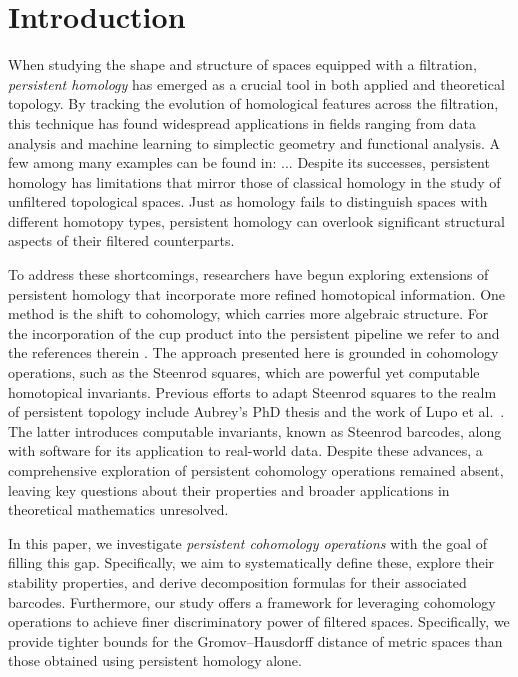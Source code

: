 
\section{Introduction} \label{s:introduction}

When studying the shape and structure of spaces equipped with a filtration, \textit{persistent homology} has emerged as a crucial tool in both applied and theoretical topology.
By tracking the evolution of homological features across the filtration, this technique has found widespread applications in fields ranging from data analysis and machine learning to simplectic geometry and functional analysis.
A few among many examples can be found in: ... 
Despite its successes, persistent homology has limitations that mirror those of classical homology in the study of unfiltered topological spaces.
Just as homology fails to distinguish spaces with different homotopy types, persistent homology can overlook significant structural aspects of their filtered counterparts.

To address these shortcomings, researchers have begun exploring extensions of persistent homology that incorporate more refined homotopical information. One method is the shift to cohomology, which carries more algebraic structure.
For the incorporation of the cup product into the persistent pipeline we refer to \cite{contessoto_et_al:LIPIcs.SoCG.2022.31, memoli2024persistent} and the references therein \cite{huang2005cup,yarmola2010persistence,herscovich2018higher,belchi2021a,contreras2022persistent}.
The approach presented here is grounded in cohomology operations, such as the Steenrod squares, which are powerful yet computable homotopical invariants.
Previous efforts to adapt Steenrod squares to the realm of persistent topology include Aubrey's PhD thesis \cite{aubrey2011thesis} and the work of Lupo et al.\ \cite{medina2022per_st}.
The latter introduces computable invariants, known as Steenrod barcodes, along with software for its application to real-world data.
Despite these advances, a comprehensive exploration of persistent cohomology operations remained absent, leaving key questions about their properties and broader applications in theoretical mathematics unresolved.

In this paper, we investigate \textit{persistent cohomology operations} with the goal of filling this gap.
Specifically, we aim to systematically define these, explore their stability properties, and derive decomposition formulas for their associated barcodes.
Furthermore, our study offers a framework for leveraging cohomology operations to achieve finer discriminatory power of filtered spaces.
Specifically, we provide tighter bounds for the Gromov--Hausdorff distance of metric spaces than those obtained using persistent homology alone.

